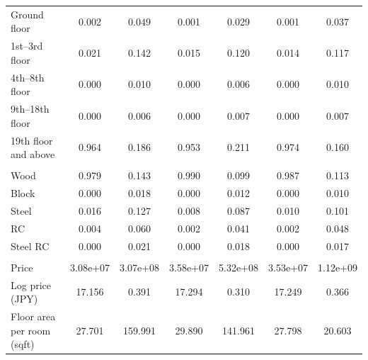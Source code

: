 \begin{table}[htbp]
\begin{tabular}{l*{3}{cc}}
Ground floor
&0.002&0.049
&0.001&0.029
&0.001&0.037\\

1st--3rd floor
&0.021&0.142
&0.015&0.120
&0.014&0.117\\

4th--8th floor
&0.000&0.010
&0.000&0.006
&0.000&0.010\\

9th--18th floor
&0.000&0.006
&0.000&0.007
&0.000&0.007\\

19th floor and above
&0.964&0.186
&0.953&0.211
&0.974&0.160\\


\addlinespace[4pt]
\multicolumn{7}{l}{\quad \textit{Building Structure}}\\

Wood
&0.979&0.143
&0.990&0.099
&0.987&0.113\\

Block
&0.000&0.018
&0.000&0.012
&0.000&0.010\\

Steel
&0.016&0.127
&0.008&0.087
&0.010&0.101\\

RC
&0.004&0.060
&0.002&0.041
&0.002&0.048\\

Steel RC
&0.000&0.021
&0.000&0.018
&0.000&0.017\\



\addlinespace[6pt]

\multicolumn{7}{l}{\textit{Panel B. Price and Size}}\\


Price
&3.08e+07&3.07e+08
&3.58e+07&5.32e+08
&3.53e+07&1.12e+09\\

Log price (JPY)
&17.156&0.391
&17.294&0.310
&17.249&0.366\\

Floor area per room (sqft)
&27.701&159.991
&29.890&141.961
&27.798&20.603\\


\bottomrule
\end{tabular}

\end{table}
